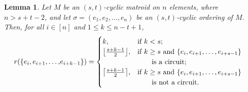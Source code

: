 \documentclass[11pt]{amsart}
\newtheorem{lemma}[theorem]{Lemma}
\DeclarePairedDelimiter\ceil{\lceil}{\rceil}
\DeclarePairedDelimiter\floor{\lfloor}{\rfloor}
\begin{document}
\begin{lemma}
\label{set_rank}
Let $M$ be an $(s, t)$-cyclic matroid on $n$ elements, where $\left.n > s+t-2\right.$, and let $\sigma = (e_1, e_2, \ldots, e_n)$ be an $(s, t)$-cyclic ordering of $M$. Then, for all $i \in [n]$ and $1\le k \leq n-t+1$,
\begin{align*}
r(\{e_i, e_{i+1}, \ldots, & e_{i+k-1}\}) =
\begin{cases}
k, & \mbox{if $k < s$}; \\
\floor*{\frac{s+k-1}{2}}, & \mbox{if $k\geq s$ and $\{e_i, e_{i+1}, \ldots, e_{i+s-1}\}$} \\
& \qquad \mbox{is a circuit}; \\
\ceil*{\frac{s+k-1}{2}}, & \mbox{if $k\geq s$ and $\{e_i, e_{i+1}, \ldots, e_{i+s-1}\}$} \\
& \qquad \mbox{is not a circuit}.
\end{cases}
\end{align*}
\end{lemma}
\end{document}
